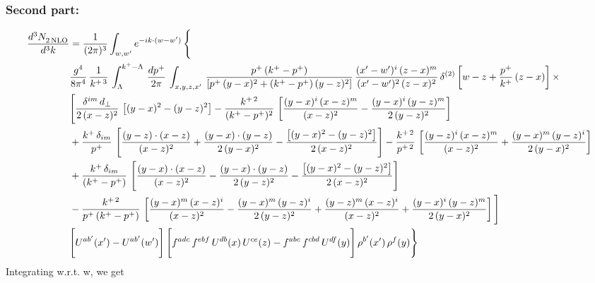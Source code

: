 \documentclass[9pt]{article}
\numberwithin{equation}{section}
\begin{document}
\subsubsection{Second part:}
\begin{align}
    \frac{d^{3}N_{2\,\rm NLO}^{\rm}}{d^{3}k}  & =  \frac{1}{(2\pi)^{3}}  \int_{w, w^\prime} e^{-ik\cdot(w-w^\prime)}\, \Bigg\{\notag \\ & \frac{g^{4}}{8\pi^{4}}\,\frac{1}{k^{+\,3}}\,\int_{\Lambda}^{k^{+}-\Lambda}\, \frac{dp^{+}}{2\pi} \, \int_{x,y,z,x'}\,\frac{p^{+}\,(k^{+}-p^{+})}{\left[p^{+}\,(y-x)^{2}+(k^{+}-p^{+})\,(y-z)^{2}\right]}\, \frac{(x'-w')^{i}\,(z-x)^{m}}{(x'-w')^{2}\,(z-x)^{2}}\,\delta^{(2)}\left[w-z+\frac{p^{+}}{k^{+}}\,(z-x)\right]\times \notag \\ & \Bigg[\frac{\delta^{im}\,d_{\perp}}{2\,(x-z)^{2}}\,\left[(y-x)^{2}-(y-z)^{2}\right]-\frac{k^{+\,2}}{(k^{+}-p^{+})^{2}}\,\left[\frac{(y-x)^{i}\,(x-z)^{m}}{(x-z)^{2}}-\frac{(y-x)^{i}\,(y-z)^{m}}{2\,(y-z)^{2}}\right]\notag \\ & +\frac{k^{+}\,\delta_{im}}{p^{+}}\,\left[\frac{(y-z)\cdot (x-z)}{(x-z)^{2}}+\frac{(y-x)\cdot (y-z)}{2\,(y-x)^{2}}-\frac{\left[(y-x)^{2}-(y-z)^{2}\right]}{2\,(x-z)^{2}}\right]-\frac{k^{+\,2}}{p^{+\,2}}\,\left[\frac{(y-z)^{i}\,(x-z)^{m}}{(x-z)^{2}}+\frac{(y-x)^{m}\,(y-z)^{i}}{2\,(y-x)^{2}}\right]\notag \\ & +\frac{k^{+}\,\delta_{im}}{(k^{+}-p^{+})}\,\left[\frac{(y-x)\cdot (x-z)}{(x-z)^{2}}-\frac{(y-x)\cdot (y-z)}{2\,(y-z)^{2}}-\frac{\left[(y-x)^{2}-(y-z)^{2}\right]}{2\,(x-z)^{2}}\right]\notag \\ &-\frac{k^{+\,2}}{p^{+}\, (k^{+}-p^{+})}\,\left[\frac{(y-x)^{m}\,(x-z)^{i}}{(x-z)^{2}}-\frac{(y-x)^{m}\,(y-z)^{i}}{2\,(y-z)^{2}}+\frac{(y-z)^{m}\,(x-z)^{i}}{(x-z)^{2}}+\frac{(y-x)^{i}\,(y-z)^{m}}{2\,(y-x)^{2}}\right]\Bigg] \notag \\ & \Bigg[U^{ab'}(x')-U^{ab'}(w')\Bigg]\,\Bigg[f^{adc}\,f^{ebf}\,U^{db}(x)\,U^{ce}(z)-f^{abc}\,f^{cbd}\,U^{df}(y)\Bigg]\,\rho^{b'}(x')\,\rho^{f}(y)\Bigg\}
\end{align}
Integrating w.r.t. w, we get
\end{document}
